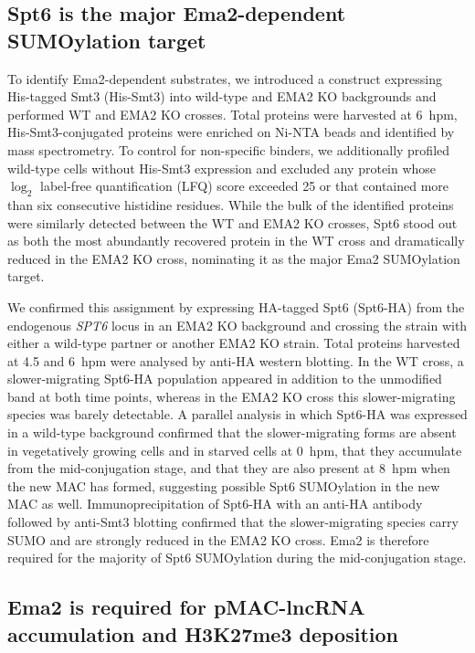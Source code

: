 \documentclass[11pt]{article}
\begin{document}
\subsection{Spt6 is the major Ema2-dependent SUMOylation target}

To identify Ema2-dependent substrates, we introduced a construct expressing
His-tagged Smt3 (His-Smt3) into wild-type and EMA2 KO backgrounds and
performed WT and EMA2 KO crosses. Total proteins were harvested at 6~hpm,
His-Smt3-conjugated proteins were enriched on Ni-NTA beads and identified
by mass spectrometry. To control for non-specific binders, we additionally
profiled wild-type cells without His-Smt3 expression and excluded any
protein whose $\log_2$ label-free quantification (LFQ) score exceeded 25
or that contained more than six consecutive histidine residues. While the
bulk of the identified proteins were similarly detected between the WT and
EMA2 KO crosses, Spt6 stood out as both the most abundantly recovered
protein in the WT cross and dramatically reduced in the EMA2 KO cross,
nominating it as the major Ema2 SUMOylation target.

We confirmed this assignment by expressing HA-tagged Spt6 (Spt6-HA) from
the endogenous \emph{SPT6} locus in an EMA2 KO background and crossing the
strain with either a wild-type partner or another EMA2 KO strain. Total
proteins harvested at 4.5 and 6~hpm were analysed by anti-HA western
blotting. In the WT cross, a slower-migrating Spt6-HA population appeared
in addition to the unmodified band at both time points, whereas in the
EMA2 KO cross this slower-migrating species was barely detectable.
A parallel analysis in which Spt6-HA was expressed in a wild-type
background confirmed that the slower-migrating forms are absent in
vegetatively growing cells and in starved cells at 0~hpm, that they
accumulate from the mid-conjugation stage, and that they are also present
at 8~hpm when the new MAC has formed, suggesting possible Spt6
SUMOylation in the new MAC as well. Immunoprecipitation of Spt6-HA with
an anti-HA antibody followed by anti-Smt3 blotting confirmed that the
slower-migrating species carry SUMO and are strongly reduced in the
EMA2 KO cross. Ema2 is therefore required for the majority of Spt6
SUMOylation during the mid-conjugation stage.

\subsection{Ema2 is required for pMAC-lncRNA accumulation and H3K27me3
deposition}
\end{document}
